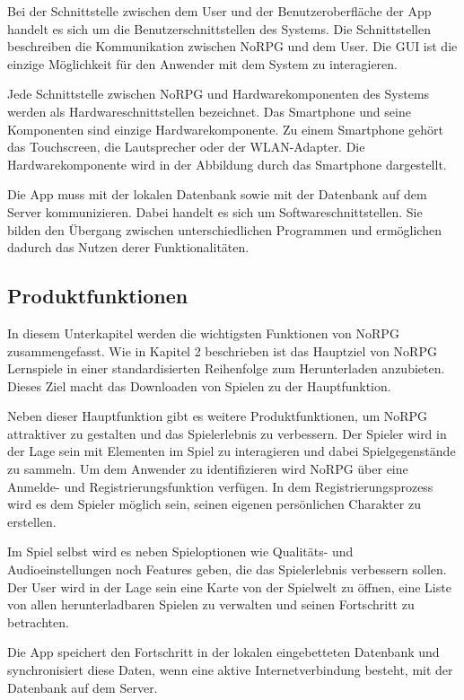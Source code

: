 		Bei der Schnittstelle zwischen dem User und der Benutzeroberfläche der App handelt es sich um die Benutzerschnittstellen des Systems. Die Schnittstellen beschreiben die Kommunikation zwischen NoRPG und dem User. Die GUI ist die einzige Möglichkeit für den Anwender mit dem System zu interagieren.
		
		Jede Schnittstelle zwischen NoRPG und Hardwarekomponenten des Systems werden als Hardwareschnittstellen bezeichnet. Das Smartphone und seine Komponenten sind einzige Hardwarekomponente. Zu einem Smartphone gehört das Touchscreen, die Lautsprecher oder der WLAN-Adapter. Die Hardwarekomponente wird in der Abbildung durch das Smartphone dargestellt.
		
		Die App muss mit der lokalen Datenbank sowie mit der Datenbank auf dem Server kommunizieren. Dabei handelt es sich um Softwareschnittstellen. Sie bilden den Übergang zwischen unterschiedlichen Programmen und ermöglichen dadurch das Nutzen derer Funktionalitäten. 

	\subsection{Produktfunktionen}
		In diesem Unterkapitel werden die wichtigsten Funktionen von NoRPG zusammengefasst. Wie in Kapitel 2 beschrieben ist das Hauptziel von NoRPG Lernspiele in einer standardisierten Reihenfolge zum Herunterladen anzubieten. Dieses Ziel macht das Downloaden von Spielen zu der Hauptfunktion. 
		
		Neben dieser Hauptfunktion gibt es weitere Produktfunktionen, um NoRPG attraktiver zu gestalten und das Spielerlebnis zu verbessern. Der Spieler wird in der Lage sein mit Elementen im Spiel zu interagieren und dabei Spielgegenstände zu sammeln. Um dem Anwender zu identifizieren wird NoRPG über eine Anmelde- und Registrierungsfunktion verfügen. In dem Registrierungsprozess wird es dem Spieler möglich sein, seinen eigenen persönlichen Charakter zu erstellen.
		
		Im Spiel selbst wird es neben Spieloptionen wie Qualitäts- und Audioeinstellungen noch Features geben, die das Spielerlebnis verbessern sollen. Der User wird in der Lage sein eine Karte von der Spielwelt zu öffnen, eine Liste von allen herunterladbaren Spielen zu verwalten und seinen Fortschritt zu betrachten.
		
		Die App speichert den Fortschritt in der lokalen eingebetteten Datenbank und synchronisiert diese Daten, wenn eine aktive Internetverbindung besteht, mit der Datenbank auf dem Server.
	
